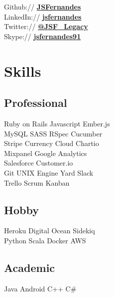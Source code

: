 \documentclass[letterpaper]{deedy-resume} %
\begin{document}
\begin{minipage}[t]{0.3\textwidth}
Github:// \href{https://github.com/JSFernandes}{\bf JSFernandes} \\
LinkedIn:// \href{https://www.linkedin.com/in/jsfernandes}{\bf jsfernandes} \\
Twitter:// \href{https://twitter.com/JSF_Legacy}{\bf @JSF\_Legacy} \\
Skype:// \href{skype:jsfernandes91?call}{\bf jsfernandes91}

\sectionspace %


\section{Skills}

\subsection{Professional}

Ruby on Rails \textbullet{} Javascript \textbullet{} Ember.js \\
MySQL \textbullet{} SASS \textbullet{} RSpec \textbullet{} Cucumber \\

Stripe \textbullet{} Currency Cloud \textbullet{} Chartio \\
Mixpanel \textbullet{} Google Analytics \\
Salesforce \textbullet{} Customer.io \\

Git \textbullet{} UNIX \textbullet{} Engine Yard \textbullet{} Slack \\
Trello \textbullet{} Scrum \textbullet{} Kanban \\

\sectionspace

\subsection{Hobby}
Heroku \textbullet{} Digital Ocean \textbullet{} Sidekiq \\
Python \textbullet{} Scala \textbullet{} Docker \textbullet{} AWS \\

\sectionspace

\subsection{Academic}
Java \textbullet{} Android \textbullet{} C++ \textbullet{} C\# \\


\end{minipage}
\end{document}
